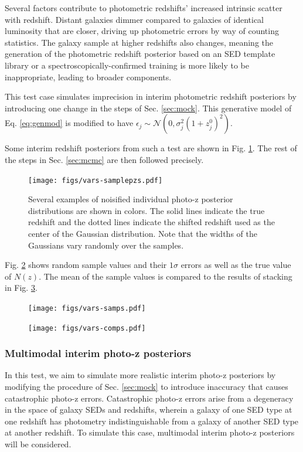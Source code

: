 \documentclass[preprint]{aastex}
\begin{document}
Several factors contribute to photometric redshifts' increased intrinsic 
scatter with redshift.  Distant galaxies dimmer compared to galaxies of 
identical luminosity that are closer, driving up photometric errors by way of 
counting statistics.  The galaxy sample at higher redshifts also changes, 
meaning the generation of the photometric redshift posterior based on an SED 
template library or a spectroscopically-confirmed training is more likely to be 
inappropriate, leading to broader components.

This test case simulates imprecision in interim photometric redshift posteriors 
by introducing one change in the steps of Sec. \ref{sec:mock}.  This generative 
model of Eq. \ref{eq:genmod} is modified to have 
$\epsilon_{j}\sim\mathcal{N}(0,\sigma^{2}_{j}(1+z^{0}_{j})^{2})$.

Some interim redshift posteriors from such a test are shown in Fig. 
\ref{fig:noisypzs}.  The rest of the steps in Sec. \ref{sec:mcmc} are then 
followed precisely.

\begin{figure}
\texttt{[image: figs/vars-samplepzs.pdf]}
\caption{Several examples of noisified individual photo-z posterior 
distributions are shown in colors.  The solid lines indicate the true redshift 
and the dotted lines indicate the shifted redshift used as the center of the 
Gaussian distribution.  Note that the widths of the Gaussians vary randomly 
over the samples.}
\label{fig:noisypzs}
\end{figure}

Fig. \ref{fig:noisy-samp} shows random sample values and their $1\sigma$ errors 
as well as the true value of $N(z)$.  The mean of the sample values is compared 
to the results of stacking in Fig. \ref{fig:noisy-comp}.

\begin{figure}
\texttt{[image: figs/vars-samps.pdf]}
\caption{}
\label{fig:noisy-samp}
\end{figure}

\begin{figure}
\texttt{[image: figs/vars-comps.pdf]}
\caption{}
\label{fig:noisy-comp}
\end{figure}

\clearpage
\subsubsection{Multimodal interim photo-z posteriors}
\label{sec:multi}

In this test, we aim to simulate more realistic interim photo-z posteriors by 
modifying the procedure of Sec. \ref{sec:mock} to introduce inaccuracy that 
causes catastrophic photo-z errors.  Catastrophic photo-z errors arise from a 
degeneracy in the space of galaxy SEDs and redshifts, wherein a galaxy of one 
SED type at one redshift has photometry indistinguishable from a galaxy of 
another SED type at another redshift.  To simulate this case, multimodal 
interim photo-z posteriors will be considered.
\end{document}
